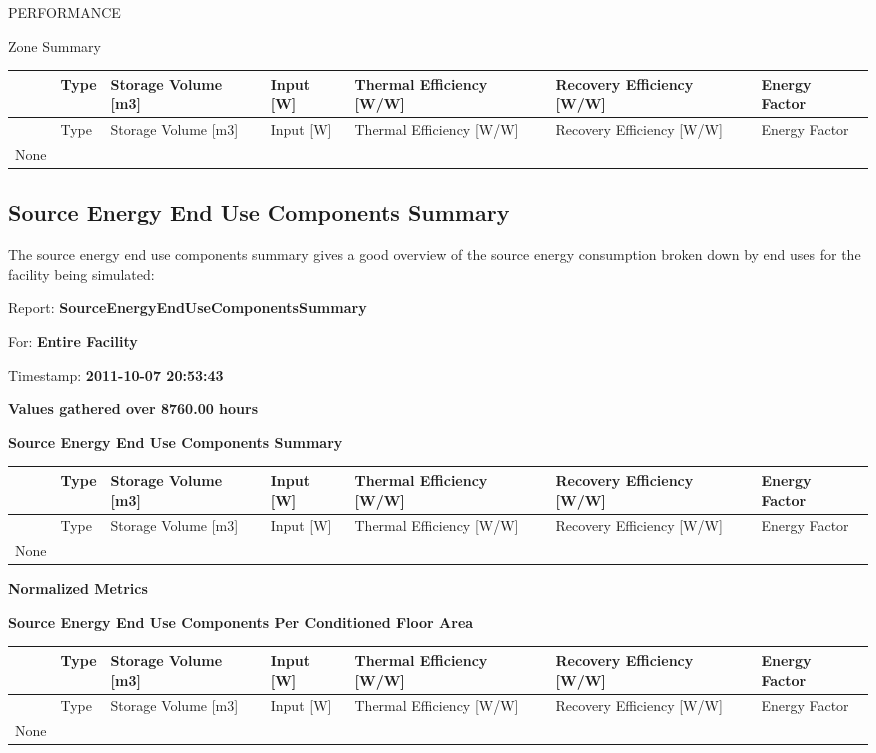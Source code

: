 PERFORMANCE

Zone Summary

\begin{longtable}[c]{p{0.85in}p{0.85in}p{0.85in}p{0.85in}p{0.85in}p{0.85in}p{0.85in}}
\toprule 
~ & Type & Storage Volume [m3] & Input [W] & Thermal Efficiency [W/W] & Recovery Efficiency [W/W] & Energy Factor \tabularnewline
\midrule
\endfirsthead

\toprule 
~ & Type & Storage Volume [m3] & Input [W] & Thermal Efficiency [W/W] & Recovery Efficiency [W/W] & Energy Factor \tabularnewline
\midrule
\endhead

None & ~ & ~ & ~ & ~ & ~ & ~ \tabularnewline
\bottomrule
\end{longtable}

\subsection{Source Energy End Use Components Summary}\label{source-energy-end-use-components-summary}

The source energy end use components summary gives a good overview of the source energy consumption broken down by end uses for the facility being simulated:

Report: \textbf{SourceEnergyEndUseComponentsSummary}

For: \textbf{Entire Facility}

Timestamp: \textbf{2011-10-07 20:53:43}

\textbf{Values gathered over 8760.00 hours}

\textbf{Source Energy End Use Components Summary}

\begin{longtable}[c]{p{0.85in}p{0.85in}p{0.85in}p{0.85in}p{0.85in}p{0.85in}p{0.85in}}
\toprule 
~ & Type & Storage Volume [m3] & Input [W] & Thermal Efficiency [W/W] & Recovery Efficiency [W/W] & Energy Factor \tabularnewline
\midrule
\endfirsthead

\toprule 
~ & Type & Storage Volume [m3] & Input [W] & Thermal Efficiency [W/W] & Recovery Efficiency [W/W] & Energy Factor \tabularnewline
\midrule
\endhead

None & ~ & ~ & ~ & ~ & ~ & ~ \tabularnewline
\bottomrule
\end{longtable}

\textbf{Normalized Metrics}

\textbf{Source Energy End Use Components Per Conditioned Floor Area}

\begin{longtable}[c]{p{0.85in}p{0.85in}p{0.85in}p{0.85in}p{0.85in}p{0.85in}p{0.85in}}
\toprule 
~ & Type & Storage Volume [m3] & Input [W] & Thermal Efficiency [W/W] & Recovery Efficiency [W/W] & Energy Factor \tabularnewline
\midrule
\endfirsthead

\toprule 
~ & Type & Storage Volume [m3] & Input [W] & Thermal Efficiency [W/W] & Recovery Efficiency [W/W] & Energy Factor \tabularnewline
\midrule
\endhead

None & ~ & ~ & ~ & ~ & ~ & ~ \tabularnewline
\bottomrule
\end{longtable}

